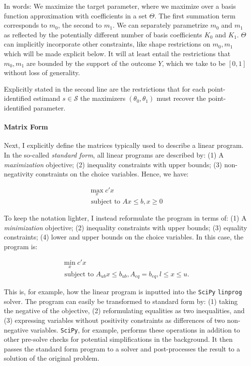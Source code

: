 \documentclass[12pt,a4paper,english]{article} %
\numberwithin{equation}{section}
\theoremstyle{definition}
\theoremstyle{remark}
\theoremstyle{plain}
\begin{document}
In words: We maximize the target parameter, where we maximize over a basis function approximation with coefficients in a set $\Theta$.
The first summation term corresponds to $m_0$, the second to $m_1$.
We can separately parametrize $m_0$ and $m_1$ as reflected by the potentially different number of basis coefficients $K_0$ and $K_1$.
$\Theta$ can implicitly incorporate other constraints, like shape restrictions on $m_0, m_1$ which will be made explicit below.
It will at least entail the restrictions that $m_0, m_1$ are bounded by the support of the outcome $Y$, which we take to be $[0,1]$ without loss of generality.

Explicitly stated in the second line are the restrictions that for each point-identified estimand $s\in\mathcal{S}$ the maximizers $(\theta_0, \theta_1)$ must recover the point-identified parameter.

\paragraph{Matrix Form}
Next, I explicitly define the matrices typically used to describe a linear program.
In the so-called \textit{standard form}, all linear programs are described by:
(1) A \textit{maximization} objective; (2) inequality constraints with upper bounds; (3) non-negativity constraints on the choice variables.
Hence, we have:

\begin{align}
  \max_x c'x \\
  \text{ subject to } Ax\leq b, x\geq0
\end{align}

To keep the notation lighter, I instead reformulate the program in terms of:
(1) A \textit{minimization} objective; (2) inequality constraints with upper bounds; (3) equality constraints; (4) lower and upper bounds on the choice variables.
In this case, the program is:

\begin{align}
  \min_x c'x \\
  \text{ subject to } A_{ub}x \leq b_{ub}, A_{eq} = b_{eq}, l\leq x\leq u.
\end{align}

This is, for example, how the linear program is inputted into the \texttt{SciPy} \texttt{linprog} solver.
The program can easily be transformed to standard form by: (1) taking the negative of the objective, (2) reformulating equalities as two inequalities, and (3) expressing variables without positivity constraints as differences of two non-negative variables.
\texttt{SciPy}, for example, performs these operations in addition to other pre-solve checks for potential simplifications in the background.
It then passes the standard form program to a solver and post-processes the result to a solution of the original problem.
\end{document}
